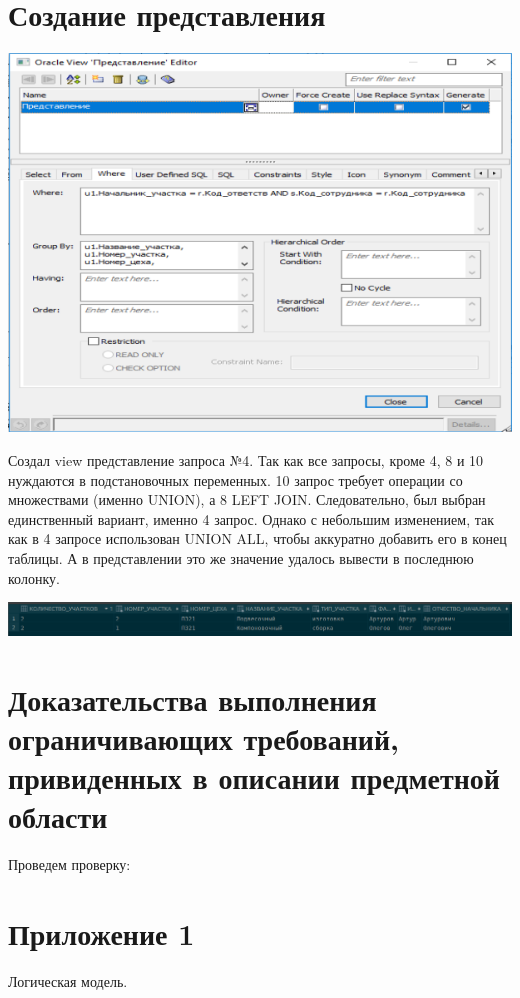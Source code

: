 \section{Создание представления}

\includegraphics[width=16cm]{./screenshots/view/sql.png}

Создал view представление запроса №4.
Так как все запросы, кроме 4, 8 и 10 нуждаются в подстановочных переменных.
10 запрос требует операции со множествами (именно UNION), а 8 LEFT JOIN.
Следовательно, был выбран единственный вариант, именно 4 запрос.
Однако с небольшим изменением, так как в 4 запросе использован UNION ALL, чтобы аккуратно добавить его в конец таблицы.
А в представлении это же значение удалось вывести в последнюю колонку.

\includegraphics[width=16cm]{./screenshots/view/result.png}

\section{Доказательства выполнения ограничивающих требований, привиденных в описании предметной области}

Проведем проверку:

\section{Приложение 1}

    Логическая модель.

